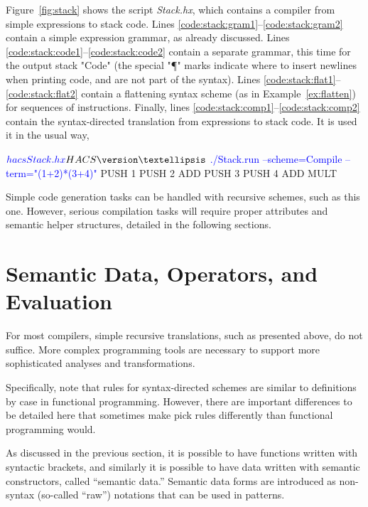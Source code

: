 \documentclass[11pt]{article} %
\begin{document}
\begin{example}\label{ex:stack}
  Figure~\ref{fig:stack} shows the \HAX script \emph{Stack.hx}, which contains a compiler from
  simple expressions to stack code. Lines \ref{code:stack:gram1}--\ref{code:stack:gram2} contain a
  simple expression grammar, as already discussed. Lines
  \ref{code:stack:code1}--\ref{code:stack:code2} contain a separate grammar, this time for the
  output stack "Code" (the special "¶" marks indicate where to insert newlines when printing code,
  and are not part of the syntax). Lines \ref{code:stack:flat1}--\ref{code:stack:flat2} contain a
  flattening syntax scheme (as in Example~\ref{ex:flatten}) for sequences of instructions.  Finally,
  lines \ref{code:stack:comp1}--\ref{code:stack:comp2} contain the syntax-directed translation from
  expressions to stack code. It is used it in the usual way,
  \begin{code}[commandchars=\\\{\}]
$ \textcolor{blue}{hacs Stack.hx}
HACS \version
…
$ \textcolor{blue}{./Stack.run --scheme=Compile --term="(1+2)*(3+4)"}
  PUSH 1 
  PUSH 2 
  ADD 
  PUSH 3 
  PUSH 4 
  ADD 
  MULT 
  \end{code}
  Simple code generation tasks can be handled with recursive schemes, such as this one. However,
  serious compilation tasks will require proper attributes and semantic helper structures, detailed
  in the following sections.
\end{example}


\section{Semantic Data, Operators, and Evaluation}
\label{sec:eval}

For most compilers, simple recursive translations, such as presented above, do not suffice. More
complex programming tools are necessary to support more sophisticated analyses and transformations.

Specifically, note that rules for syntax-directed schemes are similar to definitions by case in
functional programming. However, there are important differences to be detailed here that sometimes
make \HAX pick rules differently than functional programming would.

As discussed in the previous section, it is possible to have functions written with syntactic
brackets, and similarly it is possible to have data written with semantic constructors, called
``semantic data.''  Semantic data forms are introduced as non-syntax (so-called ``raw'') notations
that can be used in patterns.
\end{document}
